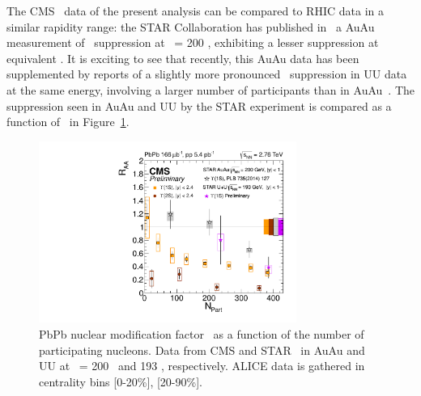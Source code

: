  The CMS \PgU\ data of the present analysis can be compared to RHIC
 data in a similar rapidity range: the STAR Collaboration has
 published in~\cite{Adamczyk:2013poh} a AuAu measurement of \PgU\
 suppression at \snn\ = 200 \GeV, exhibiting a lesser
 suppression at equivalent \Npart. It is exciting to see that
 recently, this AuAu data has been supplemented by reports of a
 slightly more pronounced \PgU\ suppression in UU data at the same energy,
 involving a larger number of participants than in
 AuAu~\cite{vertesi}. The suppression seen in AuAu and UU by the STAR
 experiment is compared as a function of \Npart\ in
 Figure~\ref{fig:CMS_STAR_npart}.
\begin{figure}[h]
  \begin{centering}  
    \includegraphics[width=0.75\textwidth]{Chapters/aUpsilon/CMS_STAR_npart.pdf}
    \caption{PbPb nuclear modification factor \RAA\ as a function of the number of participating nucleons. Data from CMS and
    STAR~\cite{Adamczyk:2013poh, vertesi} in AuAu and UU at \snn\ = 200 \GeV\ and 193 \GeV, respectively. ALICE data is gathered in centrality bins [0-20\%], [20-90\%].}
    \label{fig:CMS_STAR_npart}
  \end{centering}  
\end{figure}

